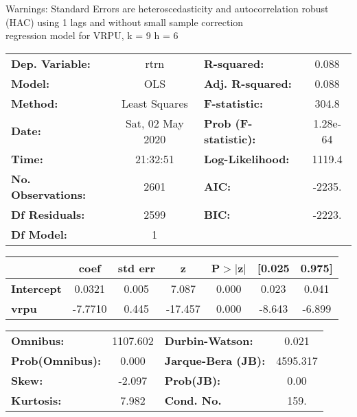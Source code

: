 Warnings: \newline
 [1] Standard Errors are heteroscedasticity and autocorrelation robust (HAC) using 1 lags and without small sample correction\\ 

regression model for VRPU, k = 9 h = 6\begin{center}
\begin{tabular}{lclc}
\toprule
\textbf{Dep. Variable:}    &       rtrn       & \textbf{  R-squared:         } &     0.088   \\
\textbf{Model:}            &       OLS        & \textbf{  Adj. R-squared:    } &     0.088   \\
\textbf{Method:}           &  Least Squares   & \textbf{  F-statistic:       } &     304.8   \\
\textbf{Date:}             & Sat, 02 May 2020 & \textbf{  Prob (F-statistic):} &  1.28e-64   \\
\textbf{Time:}             &     21:32:51     & \textbf{  Log-Likelihood:    } &    1119.4   \\
\textbf{No. Observations:} &        2601      & \textbf{  AIC:               } &    -2235.   \\
\textbf{Df Residuals:}     &        2599      & \textbf{  BIC:               } &    -2223.   \\
\textbf{Df Model:}         &           1      & \textbf{                     } &             \\
\bottomrule
\end{tabular}
\begin{tabular}{lcccccc}
                   & \textbf{coef} & \textbf{std err} & \textbf{z} & \textbf{P$> |$z$|$} & \textbf{[0.025} & \textbf{0.975]}  \\
\midrule
\textbf{Intercept} &       0.0321  &        0.005     &     7.087  &         0.000        &        0.023    &        0.041     \\
\textbf{vrpu}      &      -7.7710  &        0.445     &   -17.457  &         0.000        &       -8.643    &       -6.899     \\
\bottomrule
\end{tabular}
\begin{tabular}{lclc}
\textbf{Omnibus:}       & 1107.602 & \textbf{  Durbin-Watson:     } &    0.021  \\
\textbf{Prob(Omnibus):} &   0.000  & \textbf{  Jarque-Bera (JB):  } & 4595.317  \\
\textbf{Skew:}          &  -2.097  & \textbf{  Prob(JB):          } &     0.00  \\
\textbf{Kurtosis:}      &   7.982  & \textbf{  Cond. No.          } &     159.  \\
\bottomrule
\end{tabular}
\end{center}

